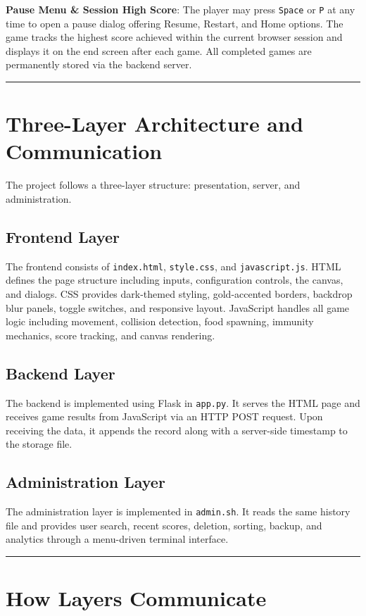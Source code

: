 \documentclass[12pt,a4paper]{article}
\newcommand{\sectionsep}{
    \vspace{1.5em}
    \noindent\rule{\textwidth}{0.8pt}
    \vspace{1.5em}
}
\begin{document}
\textbf{Pause Menu \& Session High Score}: The player may press \texttt{Space} or \texttt{P} at any time to open a pause dialog offering Resume, Restart, and Home options. The game tracks the highest score achieved within the current browser session and displays it on the end screen after each game. All completed games are permanently stored via the backend server.

\sectionsep

\section{Three-Layer Architecture and Communication}

The project follows a three-layer structure: presentation, server, and administration.

\subsection{Frontend Layer}
The frontend consists of \texttt{index.html}, \texttt{style.css}, and \texttt{javascript.js}. HTML defines the page structure including inputs, configuration controls, the canvas, and dialogs. CSS provides dark-themed styling, gold-accented borders, backdrop blur panels, toggle switches, and responsive layout. JavaScript handles all game logic including movement, collision detection, food spawning, immunity mechanics, score tracking, and canvas rendering.

\subsection{Backend Layer}
The backend is implemented using Flask in \texttt{app.py}. It serves the HTML page and receives game results from JavaScript via an HTTP POST request. Upon receiving the data, it appends the record along with a server-side timestamp to the storage file.

\subsection{Administration Layer}
The administration layer is implemented in \texttt{admin.sh}. It reads the same history file and provides user search, recent scores, deletion, sorting, backup, and analytics through a menu-driven terminal interface.

\sectionsep

\section{How Layers Communicate}
\end{document}
